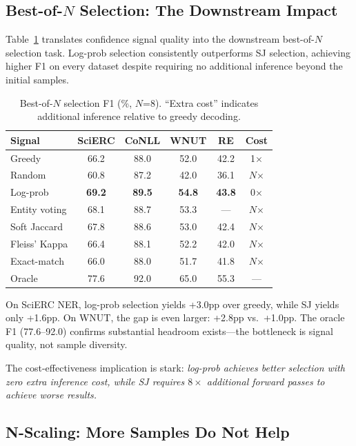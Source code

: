 \documentclass[11pt,a4paper]{article}
\begin{document}
\subsection{Best-of-$N$ Selection: The Downstream Impact}

Table~\ref{tab:best_of_n} translates confidence signal quality into the downstream best-of-$N$ selection task. Log-prob selection consistently outperforms SJ selection, achieving higher F1 on every dataset despite requiring no additional inference beyond the initial samples.

\begin{table}[t]
\centering
\small
\caption{Best-of-$N$ selection F1 (\%, $N$=8). ``Extra cost'' indicates additional inference relative to greedy decoding.}
\label{tab:best_of_n}
\begin{tabular}{lccccc}
\toprule
Signal & SciERC & CoNLL & WNUT & RE & Cost \\
\midrule
Greedy        & 66.2 & 88.0 & 52.0 & 42.2 & 1$\times$ \\
Random        & 60.8 & 87.2 & 42.0 & 36.1 & $N$$\times$ \\
\midrule
Log-prob      & \textbf{69.2} & \textbf{89.5} & \textbf{54.8} & \textbf{43.8} & 0$\times$ \\
Entity voting & 68.1 & 88.7 & 53.3 & ---  & $N$$\times$ \\
Soft Jaccard  & 67.8 & 88.6 & 53.0 & 42.4 & $N$$\times$ \\
Fleiss' Kappa & 66.4 & 88.1 & 52.2 & 42.0 & $N$$\times$ \\
Exact-match   & 66.0 & 88.0 & 51.7 & 41.8 & $N$$\times$ \\
\midrule
Oracle        & 77.6 & 92.0 & 65.0 & 55.3 & --- \\
\bottomrule
\end{tabular}
\end{table}

On SciERC NER, log-prob selection yields +3.0pp over greedy, while SJ yields only +1.6pp. On WNUT, the gap is even larger: +2.8pp vs.\ +1.0pp. The oracle F1 (77.6--92.0) confirms substantial headroom exists---the bottleneck is signal quality, not sample diversity.

The cost-effectiveness implication is stark: \emph{log-prob achieves better selection with zero extra inference cost, while SJ requires $8\times$ additional forward passes to achieve worse results.}

\subsection{N-Scaling: More Samples Do Not Help}
\end{document}

